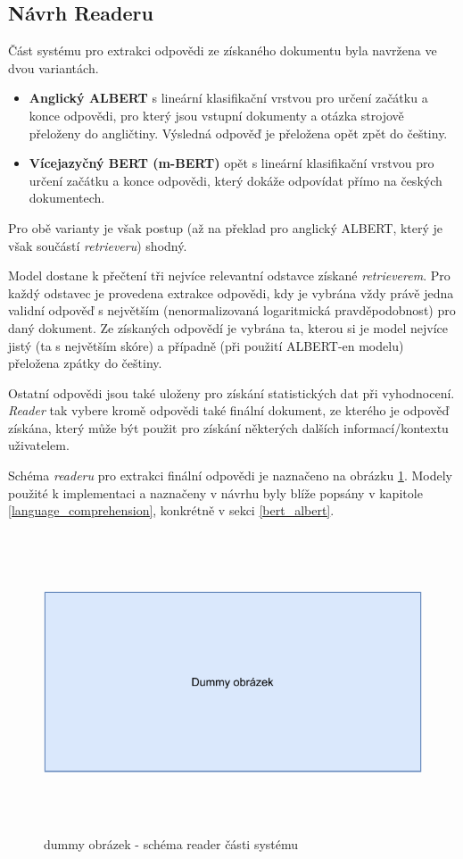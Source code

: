 \subsection{Návrh Readeru}
Část systému pro extrakci odpovědi ze získaného dokumentu byla navržena ve dvou variantách.
\begin{itemize}
    \item \textbf{Anglický ALBERT} s lineární klasifikační vrstvou pro určení začátku a konce odpovědi, pro který jsou vstupní dokumenty a otázka strojově přeloženy do angličtiny. Výsledná odpověď je přeložena opět zpět do češtiny.
    \item \textbf{Vícejazyčný BERT (m-BERT)} opět s lineární klasifikační vrstvou pro určení začátku a konce odpovědi, který dokáže odpovídat přímo na českých dokumentech.
\end{itemize}
Pro obě varianty je však postup (až na překlad pro anglický ALBERT, který je však součástí \emph{retrieveru}) shodný.\par
Model dostane k přečtení tři nejvíce relevantní odstavce získané \emph{retrieverem}. Pro každý odstavec je provedena extrakce odpovědi, kdy je vybrána vždy právě jedna validní odpověď s největším (nenormalizovaná logaritmická pravděpodobnost) pro daný dokument. Ze získaných odpovědí je vybrána ta, kterou si je model nejvíce jistý (ta s největším skóre) a případně (při použití ALBERT-en modelu) přeložena zpátky do češtiny.\par
\noindent Ostatní odpovědi jsou také uloženy pro získání statistických dat při vyhodnocení. \emph{Reader} tak vybere kromě odpovědi také finální dokument, ze kterého je odpověď získána, který může být použit pro získání některých dalších informací/kontextu uživatelem.\par
Schéma \emph{readeru} pro extrakci finální odpovědi je naznačeno na obrázku \ref{reader_schema}. Modely použité k implementaci a naznačeny v návrhu byly blíže popsány v kapitole \ref{language_comprehension}, konkrétně v sekci \ref{bert_albert}.

\begin{figure}[hbt]
	\centering
	\includegraphics[width=5.0in, height=3.5in]{obrazky/dummy_pic.pdf}
	\caption{dummy obrázek - schéma reader části systému}
	\label{reader_schema}
\end{figure}


